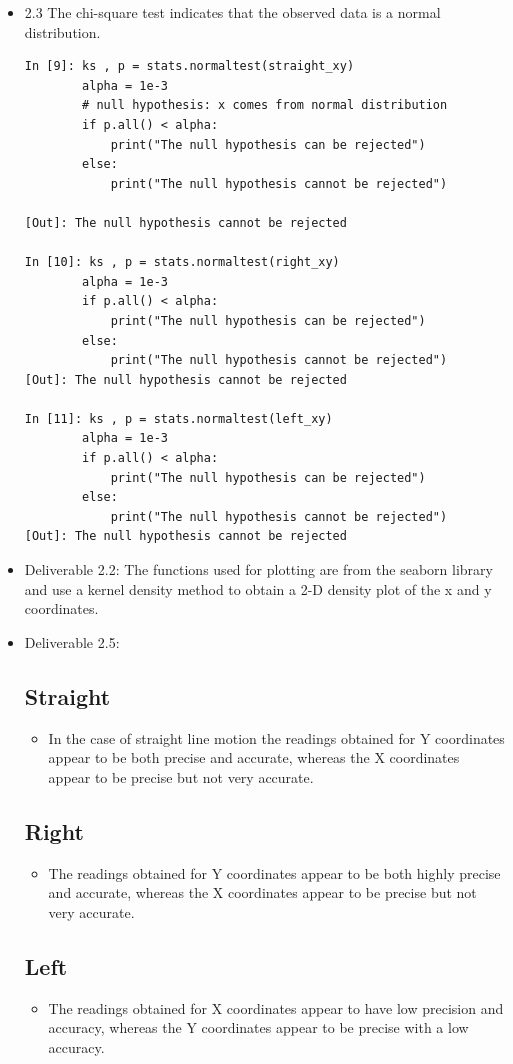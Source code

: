 \documentclass[11pt,a4paper,titlepage]{article}
\begin{document}
\begin{itemize}
\color{blue}
\item 2.3 The chi-square test indicates that the observed data is a normal distribution.
\begin{verbatim}
In [9]: ks , p = stats.normaltest(straight_xy)
		alpha = 1e-3
        # null hypothesis: x comes from normal distribution
		if p.all() < alpha: 
			print("The null hypothesis can be rejected")
		else:
			print("The null hypothesis cannot be rejected")
            
[Out]: The null hypothesis cannot be rejected

In [10]: ks , p = stats.normaltest(right_xy)
		alpha = 1e-3
		if p.all() < alpha: 
			print("The null hypothesis can be rejected")
		else:
			print("The null hypothesis cannot be rejected")
[Out]: The null hypothesis cannot be rejected

In [11]: ks , p = stats.normaltest(left_xy)
		alpha = 1e-3
		if p.all() < alpha: 
			print("The null hypothesis can be rejected")
		else:
			print("The null hypothesis cannot be rejected")
[Out]: The null hypothesis cannot be rejected
\end{verbatim}
\item Deliverable 2.2: The functions used for plotting are from the seaborn library and use a kernel density method to obtain a 2-D density plot of the x and y coordinates. 
\item Deliverable 2.5: \subsection{Straight}
\begin{itemize}
\item In the case of straight line motion the readings obtained for Y coordinates appear to be both precise and accurate, whereas the X coordinates appear to be precise but not very accurate.
\end{itemize} 
\subsection{Right}
\begin{itemize}
\item The readings obtained for Y coordinates appear to be both highly precise and accurate, whereas the X coordinates appear to be precise but not very accurate.
\end{itemize}
\subsection{Left}
\begin{itemize}
\item The readings obtained for X coordinates appear to have low precision and accuracy, whereas the Y coordinates appear to be precise with a low accuracy.
\end{itemize}
\end{itemize}
\end{document}
